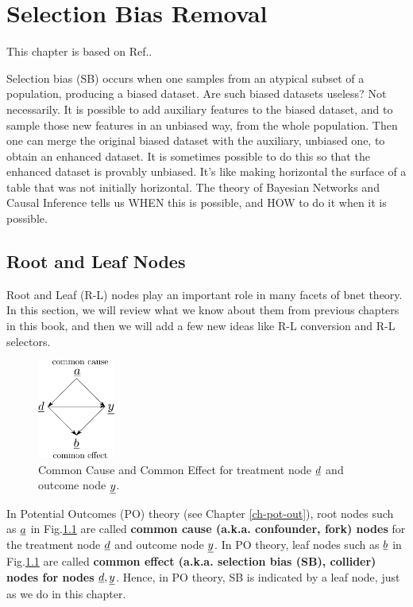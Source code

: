 \chapter{Selection Bias Removal}
\label{ch-sb-removal}
This chapter
is based on Ref.\cite{bare-sb-removal}.

Selection bias (SB)
occurs when one
samples from an
atypical subset
of a
population,
producing a biased dataset.
Are such biased
datasets
useless? Not necessarily.
It is possible to
add auxiliary features
to the biased dataset, and to
sample those new features
in an unbiased way,
 from the whole population.
Then
one can merge
the original
 biased dataset with the
auxiliary, unbiased one,
to obtain an enhanced dataset.
It is sometimes
possible to do this so that the enhanced
dataset is provably
unbiased.
It's like making horizontal
the surface of a table
 that was
 not initially
horizontal.
The theory of Bayesian Networks and Causal
Inference tells us
WHEN this is possible,
and HOW to do it
when it is possible.


\section{Root and Leaf Nodes}

Root and Leaf (R-L) nodes play an important role in many facets of
bnet theory. In this section, we will review what we know
about them from previous chapters in this book, and then we will add a few new
ideas like R-L conversion and R-L selectors.


\begin{figure}[h!]
\centering
\includegraphics[width=1in]
{sb-removal/common-cause-effect.png}
\caption{Common Cause
and Common Effect for
treatment node $\rvd$
and outcome node $\rvy$.}
\label{fig-common-cause-effect}
\end{figure}

In Potential
Outcomes (PO) theory
 (see Chapter \ref{ch-pot-out}),
root nodes such
as $\rva$ in
Fig.\ref{fig-common-cause-effect}
are called {\bf common cause
 (a.k.a. confounder, fork) nodes}
for the treatment node $\rvd$
and outcome node $\rvy$.
In PO theory, leaf nodes such as
$\rvb$ in
Fig.\ref{fig-common-cause-effect} are
called
{\bf common effect
(a.k.a. selection bias (SB), collider) nodes
for nodes $\rvd, \rvy$}.
Hence, in PO theory,
SB is indicated
by
a leaf node,
just as we do in this chapter.

